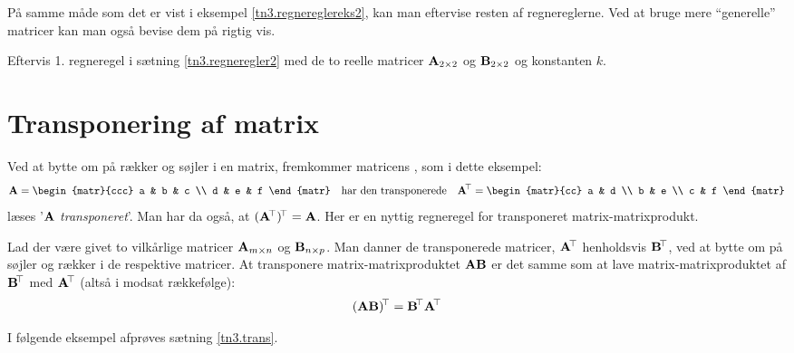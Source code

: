 På samme måde som det er vist i eksempel \ref{tn3.regnereglereks2}, kan man eftervise resten af regnereglerne. Ved at bruge mere ``generelle'' matricer kan man også bevise dem på rigtig vis.

\begin{exercise}
Eftervis 1. regneregel i sætning \ref{tn3.regneregler2} med de to reelle matricer $ \mathbf{A}_{2 \times 2} $ og $ \mathbf{B}_{2 \times 2} $ og konstanten $ k $.
\end{exercise}

\section{Transponering af matrix}

Ved at bytte om på rækker og søjler i en matrix, fremkommer matricens , som i dette eksempel:
\begin{equation}
\mA = \begin{matr}{ccc} a & b & c \\ d & e & f \end{matr} \quad \mathrm{har~den~transponerede} \quad \mA\transp = \begin{matr}{cc} a & d \\ b & e \\ c & f \end{matr} 
\end{equation}
 læses '$ \mathbf{A} $ \textit{transponeret}'. Man har da også, at $ (\mathbf{A}\hspace*{-.6mm}^{\top})\hspace*{-.6mm}^{\top} = \mathbf{A} $. Her er en nyttig regneregel for transponeret matrix-matrixprodukt.

\begin{theorem} \label{tn3.trans}
Lad der være givet to vilkårlige matricer $ \mathbf{A}_{m \times n} $ og $ \mathbf{B}_{n \times p} $. Man danner de transponerede matricer, $ \mathbf{A}\hspace*{-.6mm}^{\top} $ henholdsvis $ \mathbf{B}\hspace*{-.6mm}^{\top} $, ved at bytte om på søjler og rækker i de respektive matricer. \bs
At transponere matrix-matrixproduktet $ \mathbf{A}\mathbf{B} $ er det samme som at lave matrix-matrixproduktet af $ \mathbf{B}\hspace*{-.6mm}^{\top} $ med $ \mathbf{A}\hspace*{-.6mm}^{\top} $ (altså i modsat rækkefølge):
\begin{equation}
(\mathbf{A}\mathbf{B})\hspace*{-.6mm}^{\top} = \mathbf{B}\hspace*{-.6mm}^{\top}\mathbf{A}\hspace*{-.6mm}^{\top}
\end{equation} 
\end{theorem}

I følgende eksempel afprøves sætning \ref{tn3.trans}.


